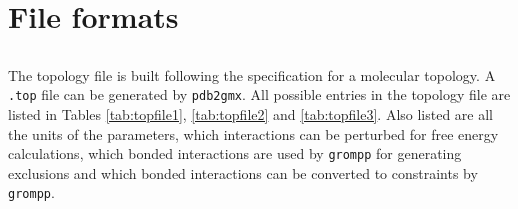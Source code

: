 \section{File formats}
\subsection{}
\label{subsec:topfile}
The topology file is built following the {\gromacs} specification for a
molecular topology.  A {\tt *.top} file can be generated by
{\tt pdb2gmx}.
All possible entries in the topology file are listed in
Tables \ref{tab:topfile1}, \ref{tab:topfile2}  and \ref{tab:topfile3}.
Also listed are all the units
of the parameters, which interactions can be perturbed for free energy
calculations, which bonded interactions are used by {\tt grompp}
for generating exclusions and which bonded interactions can be converted
to constraints by {\tt grompp}.


\newcommand{\tts}{\tt \small}

